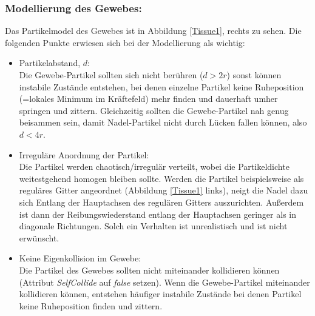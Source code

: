


\subsubsection{Modellierung des Gewebes:}
Das Partikelmodel des Gewebes ist in Abbildung \ref{Tissue1}, rechts zu sehen. Die folgenden Punkte erwiesen sich bei der Modellierung als wichtig:

    \begin{itemize}
    
      \item Partikelabstand, $d$: \\ Die Gewebe-Partikel sollten sich nicht berühren ($d>2r$) sonst können instabile Zustände entstehen, bei denen einzelne Partikel keine Ruheposition (=lokales Minimum im Kräftefeld) mehr finden und dauerhaft umher springen und zittern. Gleichzeitig sollten die Gewebe-Partikel nah genug beisammen sein, damit Nadel-Partikel nicht durch Lücken fallen können, also $d<4r$. 
      
      \item Irreguläre Anordnung der Partikel: \\ Die Partikel werden chaotisch/irregulär verteilt, wobei die Partikeldichte weitestgehend homogen bleiben sollte. Werden die Partikel beispielsweise als reguläres Gitter angeordnet (Abbildung \ref{Tissue1} links), neigt die Nadel dazu sich Entlang der Hauptachsen des regulären Gitters auszurichten. Außerdem ist dann der Reibungswiederstand entlang der Hauptachsen geringer als in diagonale Richtungen. Solch ein Verhalten ist unrealistisch und ist nicht erwünscht.
      
      
      \item Keine Eigenkollision im Gewebe: \\ Die Partikel des Gewebes sollten nicht miteinander kollidieren können (Attribut \textit{SelfCollide} auf \textit{false} setzen). Wenn die Gewebe-Partikel miteinander kollidieren können, entstehen häufiger instabile Zustände bei denen Partikel keine Ruheposition finden und zittern.
      
    \end{itemize}
    
